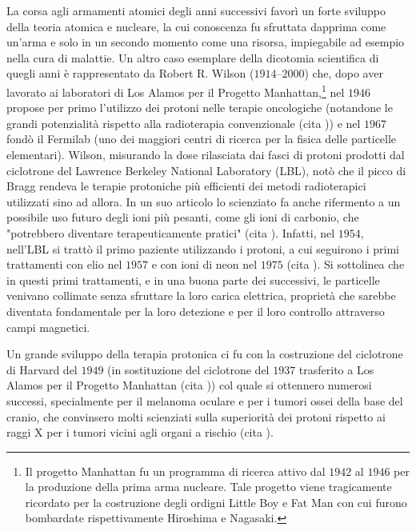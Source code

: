 \documentclass[12pt,a4paper,twoside]{report}
\begin{document}
	La corsa agli armamenti atomici degli anni successivi favorì un forte sviluppo della teoria atomica e nucleare, la cui conoscenza fu sfruttata dapprima come un'arma e solo in un secondo momento come una risorsa, impiegabile ad esempio nella cura di malattie. Un altro caso esemplare della dicotomia scientifica di quegli anni è rappresentato da Robert R. Wilson ($1914$--$2000$) che, dopo aver lavorato ai laboratori di Los Alamos per il Progetto Manhattan,\footnote{Il progetto Manhattan fu un programma di ricerca attivo dal $1942$ al $1946$ per la produzione della prima arma nucleare. Tale progetto viene tragicamente ricordato per la costruzione degli ordigni Little Boy e Fat Man con cui furono bombardate rispettivamente Hiroshima e Nagasaki.} nel $1946$ propose per primo l'utilizzo dei protoni nelle terapie oncologiche (notandone le grandi potenzialità rispetto alla radioterapia convenzionale (cita
	)) e nel $1967$ fondò il Fermilab (uno dei maggiori centri di ricerca per la fisica delle particelle elementari). Wilson, misurando la dose rilasciata dai fasci di protoni prodotti dal ciclotrone del Lawrence Berkeley National Laboratory (LBL), notò che il picco di Bragg rendeva le terapie protoniche più efficienti dei metodi radioterapici utilizzati sino ad allora. In un suo articolo lo scienziato fa anche rifermento a un possibile uso futuro degli ioni più pesanti, come gli ioni di carbonio, che "potrebbero diventare terapeuticamente pratici" (cita
	). Infatti, nel $1954$, nell'LBL si trattò il primo paziente utilizzando i protoni, a cui seguirono i primi trattamenti con elio nel $1957$ e con ioni di neon nel $1975$ (cita
	). Si sottolinea che in questi primi trattamenti, e in una buona parte dei successivi, le particelle venivano collimate senza sfruttare la loro carica elettrica, proprietà che sarebbe diventata fondamentale per la loro detezione e per il loro controllo attraverso campi magnetici.
	
	Un grande sviluppo della terapia protonica ci fu con la costruzione del ciclotrone di Harvard del $1949$ (in sostituzione del ciclotrone del $1937$ trasferito a Los Alamos per il Progetto Manhattan (cita
	)) col quale si ottennero numerosi successi, specialmente per il melanoma oculare e per i tumori ossei della base del cranio, che convinsero molti scienziati sulla superiorità dei protoni rispetto ai raggi X per i tumori vicini agli organi a rischio (cita
	).
	
\end{document}
